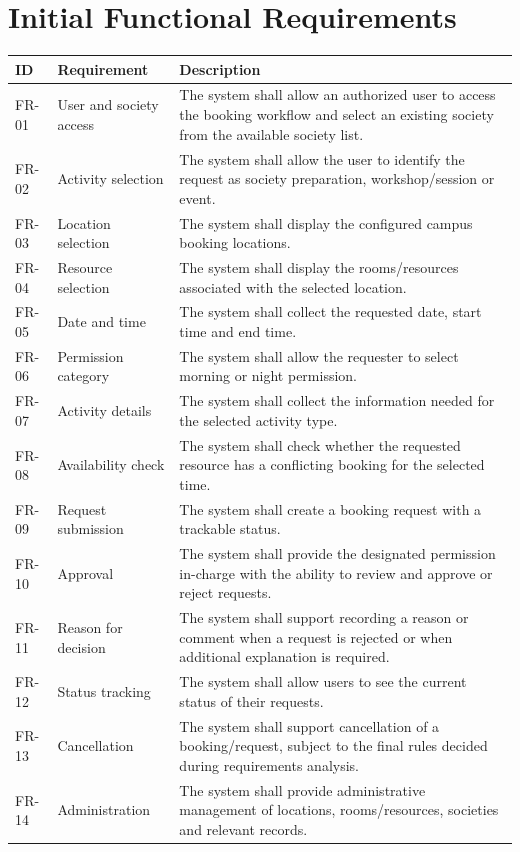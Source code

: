 \documentclass[12pt]{article}
\begin{document}
\section{Initial Functional Requirements}
\begin{longtable}{|l|l|p{8cm}|}
\hline
\textbf{ID} & \textbf{Requirement} & \textbf{Description} \\
\hline
FR-01 & User and society access & The system shall allow an authorized user to access the booking workflow and select an existing society from the available society list. \\
FR-02 & Activity selection & The system shall allow the user to identify the request as society preparation, workshop/session or event. \\
FR-03 & Location selection & The system shall display the configured campus booking locations. \\
FR-04 & Resource selection & The system shall display the rooms/resources associated with the selected location. \\
FR-05 & Date and time & The system shall collect the requested date, start time and end time. \\
FR-06 & Permission category & The system shall allow the requester to select morning or night permission. \\
FR-07 & Activity details & The system shall collect the information needed for the selected activity type. \\
FR-08 & Availability check & The system shall check whether the requested resource has a conflicting booking for the selected time. \\
FR-09 & Request submission & The system shall create a booking request with a trackable status. \\
FR-10 & Approval & The system shall provide the designated permission in-charge with the ability to review and approve or reject requests. \\
FR-11 & Reason for decision & The system shall support recording a reason or comment when a request is rejected or when additional explanation is required. \\
FR-12 & Status tracking & The system shall allow users to see the current status of their requests. \\
FR-13 & Cancellation & The system shall support cancellation of a booking/request, subject to the final rules decided during requirements analysis. \\
FR-14 & Administration & The system shall provide administrative management of locations, rooms/resources, societies and relevant records. \\
\hline
\end{longtable}
\end{document}
